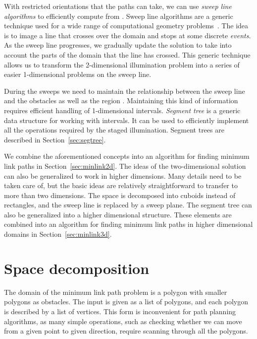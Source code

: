 \documentclass[english,gradu]{tktltiki2018}
\begin{document}
With restricted orientations that the paths can take, we can use \emph{sweep line algorithms} to efficiently compute  from .
Sweep line algorithms are a generic technique used for a wide range of computational geometry problems~\cite[Section 33.2]{clrs}.
The idea is to image a line that crosses over the domain and stops at some discrete \emph{events}.
As the sweep line progresses, we gradually update the solution to take into account the parts of the domain that the line has crossed.
This generic technique allows us to transform the 2-dimensional illumination problem into a series of easier 1-dimensional problems on the sweep line.

During the sweeps we need to maintain the relationship between the sweep line and the obstacles as well as the region .
Maintaining this kind of information requires efficient handling of 1-dimensional intervals.
\emph{Segment tree} is a generic data structure for working with intervals.
It can be used to efficiently implement all the operations required by the staged illumination.
Segment trees are described in Section~\ref{sec:segtree}.

We combine the aforementioned concepts into an algorithm for finding minimum link paths in Section~\ref{sec:minlink2d}.
The ideas of the two-dimensional solution can also be generalized to work in higher dimensions.
Many details need to be taken care of, but the basic ideas are relatively straightforward to transfer to more than two dimensions.
The space is decomposed into cuboids instead of rectangles, and the sweep line is replaced by a sweep plane.
The segment tree can also be generalized into a higher dimensional structure.
These elements are combined into an algorithm for finding minimum link paths in higher dimensional domains in Section~\ref{sec:minlink3d}.



\section{Space decomposition}\label{sec:decomposition}

The domain of the minimum link path problem is a polygon with smaller polygons as obstacles.
The input is given as a list of polygons, and each polygon is described by a list of vertices.
This form is inconvenient for path planning algorithms, as many simple operations, such as checking whether we can move from a given point to given direction, require scanning through all the polygons.
\end{document}
